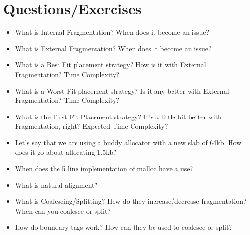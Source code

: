 \section{Questions/Exercises}

\begin{itemize}
\tightlist
\item
  What is Internal Fragmentation? When does it become an issue?
\item
  What is External Fragmentation? When does it become an issue?
\item
  What is a Best Fit placement strategy? How is it with External Fragmentation? Time Complexity?
\item
  What is a Worst Fit placement strategy? Is it any better with External Fragmentation? Time Complexity?
\item
  What is the First Fit Placement strategy? It's a little bit better with Fragmentation, right? Expected Time Complexity?
\item
  Let's say that we are using a buddy allocator with a new slab of 64kb. How does it go about allocating 1.5kb?
\item
  When does the 5 line  implementation of malloc have a use?
\item
  What is natural alignment?
\item
  What is Coalescing/Splitting? How do they increase/decrease fragmentation? When can you coalesce or split?
\item
  How do boundary tags work? How can they be used to coalesce or split?
\end{itemize}



